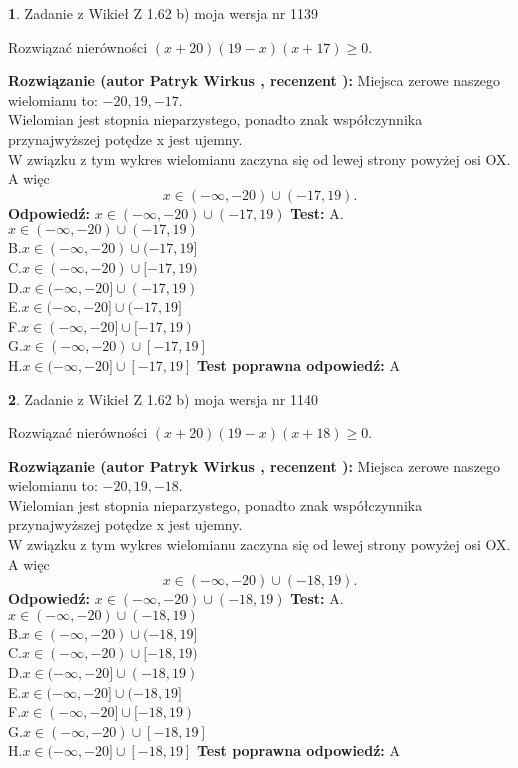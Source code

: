 \documentclass[12pt, a4paper]{article}
\theoremstyle{definition} %
\newtheorem{zad}{}
\newcommand{\zadStart}[1]{\begin{zad}#1\newline}
\newcommand{\zadStop}{\end{zad}}
\newcommand{\rozwStart}[2]{\noindent \textbf{Rozwiązanie (autor #1 , recenzent #2): }\newline}
\newcommand{\rozwStop}{\newline}
\newcommand{\odpStart}{\noindent \textbf{Odpowiedź:}\newline}
\newcommand{\odpStop}{\newline}
\newcommand{\testStart}{\noindent \textbf{Test:}\newline}
\newcommand{\testStop}{\newline}
\newcommand{\kluczStart}{\noindent \textbf{Test poprawna odpowiedź:}\newline}
\newcommand{\kluczStop}{\newline}
\begin{document}
\zadStart{Zadanie z Wikieł Z 1.62 b) moja wersja nr 1139}

Rozwiązać nierówności $(x+20)(19-x)(x+17)\ge0$.
\zadStop
\rozwStart{Patryk Wirkus}{}
Miejsca zerowe naszego wielomianu to: $-20, 19, -17$.\\
Wielomian jest stopnia nieparzystego, ponadto znak współczynnika przy\linebreak najwyższej potędze x jest ujemny.\\ W związku z tym wykres wielomianu zaczyna się od lewej strony powyżej osi OX. A więc $$x \in (-\infty,-20) \cup (-17,19).$$
\rozwStop
\odpStart
$x \in (-\infty,-20) \cup (-17,19)$
\odpStop
\testStart
A.$x \in (-\infty,-20) \cup (-17,19)$\\
B.$x \in (-\infty,-20) \cup (-17,19]$\\
C.$x \in (-\infty,-20) \cup [-17,19)$\\
D.$x \in (-\infty,-20] \cup (-17,19)$\\
E.$x \in (-\infty,-20] \cup (-17,19]$\\
F.$x \in (-\infty,-20] \cup [-17,19)$\\
G.$x \in (-\infty,-20) \cup [-17,19]$\\
H.$x \in (-\infty,-20] \cup [-17,19]$
\testStop
\kluczStart
A
\kluczStop



\zadStart{Zadanie z Wikieł Z 1.62 b) moja wersja nr 1140}

Rozwiązać nierówności $(x+20)(19-x)(x+18)\ge0$.
\zadStop
\rozwStart{Patryk Wirkus}{}
Miejsca zerowe naszego wielomianu to: $-20, 19, -18$.\\
Wielomian jest stopnia nieparzystego, ponadto znak współczynnika przy\linebreak najwyższej potędze x jest ujemny.\\ W związku z tym wykres wielomianu zaczyna się od lewej strony powyżej osi OX. A więc $$x \in (-\infty,-20) \cup (-18,19).$$
\rozwStop
\odpStart
$x \in (-\infty,-20) \cup (-18,19)$
\odpStop
\testStart
A.$x \in (-\infty,-20) \cup (-18,19)$\\
B.$x \in (-\infty,-20) \cup (-18,19]$\\
C.$x \in (-\infty,-20) \cup [-18,19)$\\
D.$x \in (-\infty,-20] \cup (-18,19)$\\
E.$x \in (-\infty,-20] \cup (-18,19]$\\
F.$x \in (-\infty,-20] \cup [-18,19)$\\
G.$x \in (-\infty,-20) \cup [-18,19]$\\
H.$x \in (-\infty,-20] \cup [-18,19]$
\testStop
\kluczStart
A
\kluczStop
\end{document}
